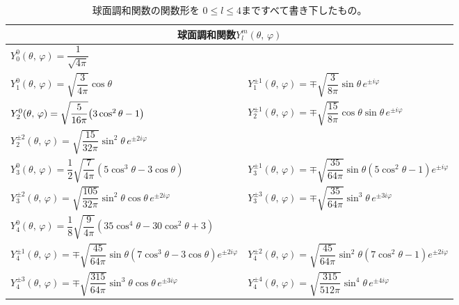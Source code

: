 \documentclass[../../master.tex]{subfiles}
\begin{document}
\begin{table}[h]
	\centering
	\caption{球面調和関数の関数形を
		\(0\leq l \leq 4\)まですべて書き下したもの。}
	\begin{tabular}[t]{ll}
		\hline
		\multicolumn{2}{c}{球面調和関数\(Y_l^m(\theta,\,\varphi)\)}                                                                 \\
		\hline \hline
		\(Y_0^{0}(\theta,\,\varphi)=\dfrac{1}{\sqrt{4\pi}}\) &
		\rule[-5mm]{0mm}{12mm}                                                                                                \\
		\(Y_1^{0}(\theta,\,\varphi) =\sqrt{\dfrac{3}{4\pi}}\cos\theta\)                                &
		\(Y_1^{\pm 1}(\theta,\,\varphi) =\mp\sqrt{\dfrac{3}{8\pi}}\sin\theta \,e^{\pm i\varphi}\)
		\rule[-5mm]{0mm}{10mm}                                                                                                \\
		\(Y_2^{0}(\theta,\,\varphi) =\sqrt{\dfrac{5}{16\pi}}\qty(3\cos^2\theta-1)\)                    &
		\(Y_2^{\pm 1}(\theta,\,\varphi) =\mp\sqrt{\dfrac{15}{8\pi}}\cos\theta\sin\theta \,e^{\pm i\varphi}\)
		\rule[-5mm]{0mm}{10mm}                                                                                                \\
		\(Y_2^{\pm 2}(\theta,\,\varphi) =\sqrt{\dfrac{15}{32\pi}}\sin^2\theta \,e^{\pm 2 i\varphi}\)&
		\rule[-5mm]{0mm}{10mm}                                                                                                \\
		\(Y_3^0(\theta,\,\varphi) =\dfrac{1}{2}\sqrt{\dfrac{7}{4\pi}}(5\cos^3\theta-3\cos\theta)\) &
		\(Y_3^{\pm 1}(\theta,\,\varphi) =\mp\sqrt{\dfrac{35}{64\pi}}\sin\theta(5\cos^2\theta-1) e^{\pm i\varphi}\)
		\rule[-5mm]{0mm}{10mm}\\
		\(Y_3^{\pm 2}(\theta,\,\varphi) =\sqrt{\dfrac{105}{32\pi}}\sin^2\theta\cos\theta \,e^{\pm 2i\varphi}\) &
		\(Y_3^{\pm 3}(\theta,\,\varphi) =\mp\sqrt{\dfrac{35}{64\pi}}\sin^3\theta \,e^{\pm 3i\varphi}\)
		\rule[-5mm]{0mm}{10mm}\\
		\(Y_4^0(\theta,\,\varphi) =\dfrac{1}{8}\sqrt{\dfrac{9}{4\pi}}(35\cos^4\theta-30\cos^2\theta+3)\) &
		\rule[-5mm]{0mm}{10mm}\\
		\(Y_4^{\pm 1}(\theta,\,\varphi) =\mp\sqrt{\dfrac{45}{64\pi}}\sin\theta(7\cos^3\theta-3\cos\theta) e^{\pm 2i\varphi}\)&
		\(Y_4^{\pm 2}(\theta,\,\varphi) =\sqrt{\dfrac{45}{64\pi}}\sin^2\theta(7\cos^2\theta-1) e^{\pm 2i\varphi}\)
		\rule[-5mm]{0mm}{10mm}\\
		\(Y_4^{\pm 3}(\theta,\,\varphi) =\mp\sqrt{\dfrac{315}{64\pi}}\sin^3\theta\cos\theta \,e^{\pm 3i\varphi}\) &
		\(Y_4^{\pm 4}(\theta,\,\varphi) =\sqrt{\dfrac{315}{512\pi}}\sin^4\theta \,e^{\pm 4i\varphi}\)
		\rule[-5mm]{0mm}{10mm}\\
		\hline
	\end{tabular}
	\renewcommand{\arraystretch}{1.0}
\end{table}
\end{document}
